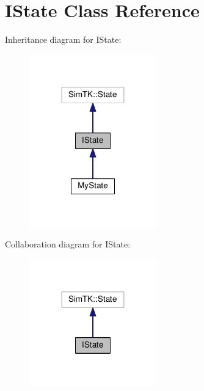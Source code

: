 \hypertarget{classIState}{}\section{I\+State Class Reference}
\label{classIState}


Inheritance diagram for I\+State\+:\nopagebreak
\begin{figure}[H]
\begin{center}
\leavevmode
\includegraphics[width=156pt]{classIState__inherit__graph}
\end{center}
\end{figure}


Collaboration diagram for I\+State\+:\nopagebreak
\begin{figure}[H]
\begin{center}
\leavevmode
\includegraphics[width=156pt]{classIState__coll__graph}
\end{center}
\end{figure}
